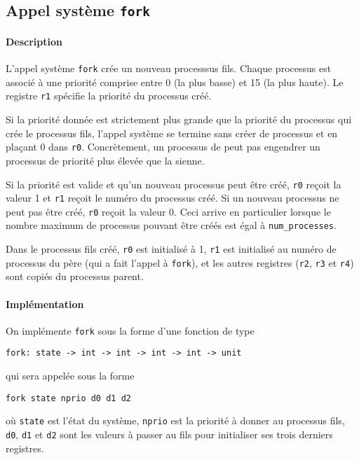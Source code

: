 \documentclass[french, toc]{../cs-classes/cs-classes}
\begin{document}
\subsection{Appel système \texttt{fork}}
\paragraph*{Description}
L'appel système \texttt{fork} crée un nouveau processsus fils. Chaque processus est associé à une priorité comprise entre 0 (la plus basse) et 15 (la plus haute). Le registre \texttt{r1} spécifie la priorité du processus créé. 

Si la priorité donnée est strictement plus grande que la priorité du processus qui crée le processus fils, l’appel système se termine sans créer de processus et en plaçant 0 dans \texttt{r0}. Concrètement, un processus de peut pas engendrer un processus de priorité plus élevée que la sienne. 

Si la priorité est valide et qu’un nouveau processus peut être créé, \texttt{r0} reçoit la valeur 1 et \texttt{r1} reçoit le numéro du processus créé. Si un nouveau processus ne peut pas être créé, \texttt{r0} reçoit la valeur 0. Ceci arrive en particulier lorsque le nombre maximum de processus pouvant être créés est égal à \texttt{num\_processes}.

Dans le processus ﬁls créé, \texttt{r0} est initialisé à 1, \texttt{r1} est initialisé au numéro de processus du père (qui a fait l’appel à \texttt{fork}), et les autres registres (\texttt{r2}, \texttt{r3} et \texttt{r4}) sont copiés du processus parent.

\paragraph*{Implémentation} On implémente \texttt{fork} sous la forme d'une fonction de type
\begin{center}
    \texttt{fork: state -> int -> int -> int -> int -> unit}
\end{center}
qui sera appelée sous la forme
\begin{center}
    \texttt{fork state nprio d0 d1 d2}
\end{center}
où \texttt{state} est l'état du système, \texttt{nprio} est la priorité à donner au processus fils, \texttt{d0}, \texttt{d1} et \texttt{d2} sont les valeurs à passer au fils pour initialiser ses trois derniers registres.
\end{document}
